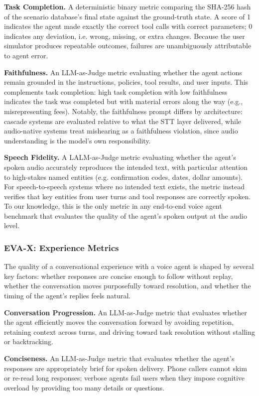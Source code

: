 \textbf{Task Completion.} A deterministic binary metric comparing the SHA-256 hash of the scenario database's final state against the ground-truth state. A score of 1 indicates the agent made exactly the correct tool calls with correct parameters; 0 indicates any deviation, i.e. wrong, missing, or extra changes. Because the user simulator produces repeatable outcomes, failures are unambiguously attributable to agent error.


\textbf{Faithfulness.} An LLM-as-Judge metric evaluating whether the agent actions remain grounded in the instructions, policies, tool results, and user inputs. This complements task completion: high task completion with low faithfulness indicates the task was completed but with material errors along the way (e.g., misrepresenting fees). Notably, the faithfulness prompt differs by architecture: cascade systems are evaluated relative to what the STT layer delivered, while audio-native systems treat mishearing as a faithfulness violation, since audio understanding is the model's own responsibility.


\textbf{Speech Fidelity.} A LALM-as-Judge metric evaluating whether the agent's spoken audio accurately reproduces the intended text, with particular attention to high-stakes named entities (e.g. confirmation codes, dates, dollar amounts). For speech-to-speech systems where no intended text exists, the metric instead verifies that key entities from user turns and tool responses are correctly spoken. To our knowledge, this is the only metric in any end-to-end voice agent benchmark that evaluates the quality of the agent's spoken output at the audio level. 

\subsubsection{EVA-X: Experience Metrics}

The quality of a conversational experience with a voice agent is shaped by several key factors: whether responses are concise enough to follow without replay, whether the conversation moves purposefully toward resolution, and whether the timing of the agent's replies feels natural. 

\textbf{Conversation Progression.} An LLM-as-Judge metric that 
evaluates whether the agent efficiently moves the conversation forward by 
avoiding repetition, retaining context across turns, and driving 
toward task resolution without stalling or backtracking. 

\textbf{Conciseness.} An LLM-as-Judge metric that evaluates whether 
the agent's responses are appropriately brief for spoken 
delivery. Phone callers cannot skim or re-read long responses; verbose agents fail users when they impose cognitive overload by providing too many details or questions.

